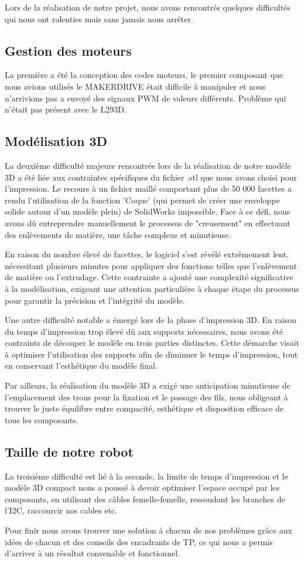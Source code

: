 Lors de la réalisation de notre projet, nous avons rencontrés quelques difficultés qui nous ont ralenties mais sans jamais nous arrêter.

\subsection{Gestion des moteurs}
La première a été la conception des codes moteurs, le premier composant que nous avions utilisés le MAKERDRIVE était difficile à manipuler et nous n'arrivions pas a envoyé des signaux PWM de valeurs différents. Problème qui n'était pas présent avec le L293D.

\subsection{Modélisation 3D}
La deuxième difficulté majeure rencontrée lors de la réalisation de notre modèle 3D a été liée aux contraintes spécifiques du fichier .stl que nous avons choisi pour l'impression. Le recours à un fichier maillé comportant plus de 50 000 facettes a rendu l'utilisation de la fonction 'Coque' (qui permet de créer une enveloppe solide autour d'un modèle plein) de SolidWorks impossible. Face à ce défi, nous avons dû entreprendre manuellement le processus de "creusement" en effectuant des enlèvements de matière, une tâche complexe et minutieuse.

En raison du nombre élevé de facettes, le logiciel s'est révélé extrêmement lent, nécessitant plusieurs minutes pour appliquer des fonctions telles que l'enlèvement de matière ou l'extrudage. Cette contrainte a ajouté une complexité significative à la modélisation, exigeant une attention particulière à chaque étape du processus pour garantir la précision et l'intégrité du modèle.

Une autre difficulté notable a émergé lors de la phase d'impression 3D. En raison du temps d'impression trop élevé dû aux supports nécessaires, nous avons été contraints de découper le modèle en trois parties distinctes. Cette démarche visait à optimiser l'utilisation des supports afin de diminuer le temps d'impression, tout en conservant l'esthétique du modèle final.

Par ailleurs, la réalisation du modèle 3D a exigé une anticipation minutieuse de l'emplacement des trous pour la fixation et le passage des fils, nous obligeant à trouver le juste équilibre entre compacité, esthétique et disposition efficace de tous les composants.

\subsection{Taille de notre robot}
La troisième difficulté est lié à la seconde, la limite de temps d'impression et le modèle 3D compact nous a poussé à devoir optimiser l'espace occupé par les composants, en utilisant des câbles femelle-femelle, ressoudant les branches de l'I2C, raccourcir nos cables etc.

Pour finir nous avons trouver une solution à chacun de nos problèmes grâce aux idées de chacun et des conseils des encadrants de TP, ce qui nous a permis d'arriver à un résultat convenable et fonctionnel.

\newpage
